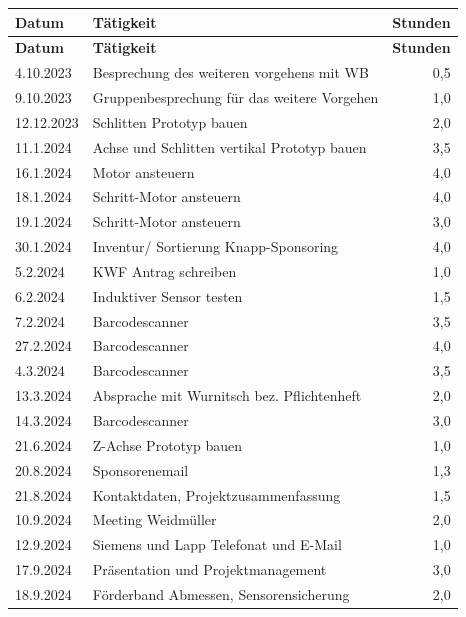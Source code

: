 \begin{longtable}{|l|p{10cm}|r|}
    \hline
    \textbf{Datum} & \textbf{Tätigkeit} & \textbf{Stunden} \\
    \hline
    \endfirsthead

    \hline
    \textbf{Datum} & \textbf{Tätigkeit} & \textbf{Stunden} \\
    \hline
    \endhead

    \hline
    \endfoot

    \hline
    \endlastfoot

    4.10.2023	&	Besprechung des weiteren vorgehens mit WB	&	0,5	\\
    9.10.2023	&	Gruppenbesprechung für das weitere Vorgehen	&	1,0	\\
    12.12.2023	&	Schlitten Prototyp bauen	&	2,0	\\
    11.1.2024	&	Achse und Schlitten vertikal Prototyp bauen	&	3,5	\\
    16.1.2024	&	Motor ansteuern	&	4,0	\\
    18.1.2024	&	Schritt-Motor ansteuern	&	4,0	\\
    19.1.2024	&	Schritt-Motor ansteuern	&	3,0	\\
    30.1.2024	&	Inventur/ Sortierung Knapp-Sponsoring	&	4,0	\\
    5.2.2024	&	KWF Antrag schreiben	&	1,0	\\
    6.2.2024	&	Induktiver Sensor testen	&	1,5	\\
    7.2.2024	&	Barcodescanner	&	3,5	\\
    27.2.2024	&	Barcodescanner	&	4,0	\\
    4.3.2024	&	Barcodescanner	&	3,5	\\
    13.3.2024	&	Absprache mit Wurnitsch bez. Pflichtenheft	&	2,0	\\
    14.3.2024	&	Barcodescanner	&	3,0	\\
    21.6.2024	&	Z-Achse Prototyp bauen	&	1,0	\\
    20.8.2024	&	Sponsorenemail	&	1,3	\\
    21.8.2024	&	Kontaktdaten, Projektzusammenfassung	&	1,5	\\
    10.9.2024	&	Meeting Weidmüller	&	2,0	\\
    12.9.2024	&	Siemens und Lapp Telefonat und E-Mail	&	1,0	\\
    17.9.2024	&	Präsentation und Projektmanagement	&	3,0	\\
    18.9.2024	&	Förderband Abmessen, Sensorensicherung	&	2,0	\\

\end{longtable}
